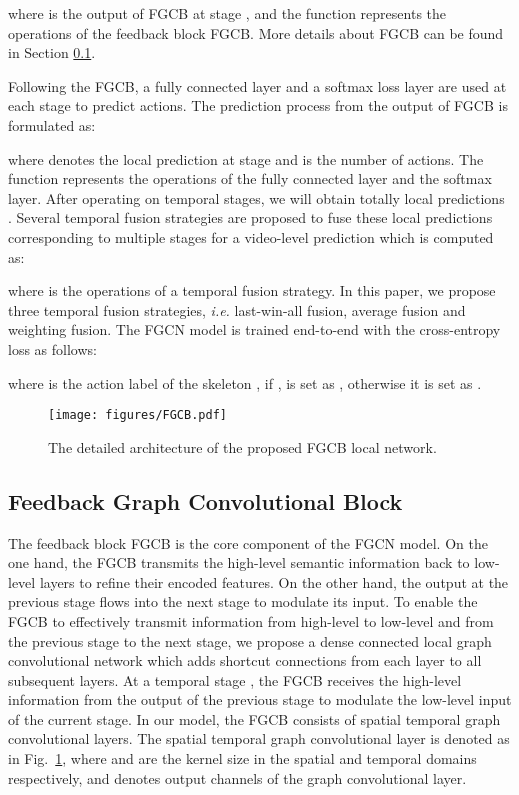 \documentclass[runningheads]{llncs}
\begin{document}
where  is the output of FGCB at stage , and the function  represents the operations of the feedback block FGCB. More details about FGCB can be found in Section \ref{section fgcb}.

Following the FGCB, a fully connected layer and a softmax loss layer are used at each stage to predict actions. The prediction process from the output  of FGCB is formulated as:

where  denotes the local prediction at stage  and  is the number of actions. The function  represents the operations of the fully connected layer and the softmax layer. After operating on  temporal stages, we will obtain totally  local predictions . Several temporal fusion strategies are proposed to fuse these local predictions corresponding to multiple stages for a video-level prediction  which is computed as:

where  is the operations of a temporal fusion strategy. In this paper, we propose three temporal fusion strategies, \textit{i.e.} last-win-all fusion, average fusion and weighting fusion. The FGCN model is trained end-to-end with the cross-entropy loss as follows:

where  is the action label of the skeleton , if ,  is set as , otherwise it is set as .

\begin{figure}[t]
	\centering
	\texttt{[image: figures/FGCB.pdf]}
	\caption{The detailed architecture of the proposed FGCB local network.}
	\vspace{-4mm}
	\label{fig-fgcb}
\end{figure}

\subsection{Feedback Graph Convolutional Block}
\label{section fgcb}

The feedback block FGCB is the core component of the FGCN model. On the one hand, the FGCB transmits the high-level semantic information back to low-level layers to refine their encoded features. On the other hand, the output at the previous stage flows into the next stage to modulate its input. To enable the FGCB to effectively transmit information from high-level to low-level and from the previous stage to the next stage, we propose a dense connected local graph convolutional network which adds shortcut connections from each layer to all subsequent layers. At a temporal stage , the FGCB receives the high-level information from the output  of the previous stage to modulate the low-level input  of the current stage. In our model, the FGCB consists of  spatial temporal graph convolutional layers. The spatial temporal graph convolutional layer is denoted as  in Fig.~\ref{fig-fgcb}, where  and  are the kernel size in the spatial and temporal domains respectively, and  denotes output channels of the graph convolutional layer.
\end{document}
